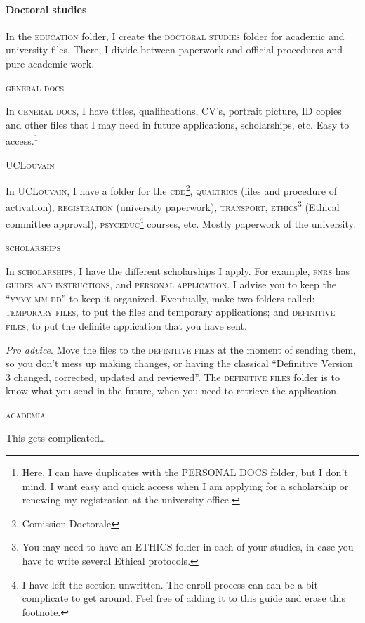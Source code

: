 \documentclass{article}
\begin{document}
\paragraph{Doctoral studies}
\label{parag: doct}
In the \textsc{education} folder, I create the \textsc{doctoral studies}  folder for academic and university files. There, I divide between paperwork and official procedures and pure academic work. 
\begin{center}
    \textsc{general docs}
\end{center}
In \textsc{general docs}, I have titles, qualifications, CV’s, portrait picture, ID copies and other files that I may need in future applications, scholarships, etc. Easy to access.\footnote{Here, I can have duplicates with the PERSONAL DOCS folder, but I don’t mind. I want easy and quick access when I am applying for a scholarship or renewing my registration at the university office.}
\begin{center}
    \textsc{UCLouvain}
\end{center}
In \textsc{UCLouvain}, I have a folder for the \textsc{cdd}\footnote{Comission Doctorale}, \textsc{qualtrics} (files and procedure of activation), \textsc{registration} (university paperwork), \textsc{transport}, \textsc{ethics}\footnote{You may need to have an \textsc{ETHICS} folder in each of your studies, in case you have to write several Ethical protocols.}  (Ethical committee approval), \textsc{psyceduc}\footnote{I have left the section  unwritten. The enroll process can can be a bit complicate to get around. Feel free of adding it to this guide and erase this footnote.} courses, etc. Mostly paperwork of the university.
\begin{center}
    \textsc{scholarships}
\end{center}
In \textsc{scholarships}, I have the different scholarships I apply. For example, \textsc{fnrs} has \textsc{guides and instructions}, and \textsc{personal application}. I advise you to keep the ``\textsc{yyyy-mm-dd}'' to keep it organized. Eventually, make two folders called: \textsc{temporary files}, to put the files and temporary applications; and \textsc{definitive files}, to put the definite application that you have sent. 

\emph{Pro advice}. Move the files to the \textsc{definitive files} at the moment of sending them, so you don’t mess up making changes, or having the classical “Definitive Version 3 changed, corrected, updated and reviewed”. The \textsc{definitive files} folder is to know what you send in the future, when you need to retrieve the application.
\begin{center}
    \textsc{academia}
\end{center}
This gets complicated…
\end{document}
